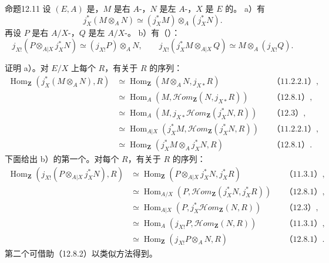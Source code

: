 \begin{SGAresult}{命题}{12.11}
设 $(E,A)$ 是，$M$ 是右 $A$-，$N$ 是左 $A$-，$X$ 是 $E$ 的。
a）有
\[j_X^*(M\otimes_A N)\simeq(j_X^*M)\otimes_A(j_X^*N).\]
再设 $P$ 是右 $A/X$-，$Q$ 是左 $A/X$-。
b）有（）：
\[j_{X!}(P\otimes_{A|X}j_X^*N)\simeq(j_{X!}P)\otimes_A N,\qquad
j_{X!}(j_X^*M\otimes_{A|X}Q)\simeq M\otimes_A(j_{X!}Q).\]
\end{SGAresult}
证明 a）。对 $E/X$ 上每个 $R$，有关于 $R$ 的序列：
\begin{align*}
\operatorname{Hom}_{\mathbf Z}(j_X^*(M\otimes_A N),R)
&\simeq\operatorname{Hom}_{\mathbf Z}(M\otimes_A N,j_{X*}R)&&\text{（11.2.2.1）},\\
&\simeq\operatorname{Hom}_A(M,\mathscr{H}\!om_{\mathbf Z}(N,j_{X*}R))&&\text{（12.8.1）},\\
&\simeq\operatorname{Hom}_A(M,j_{X*}\mathscr{H}\!om_{\mathbf Z}(j_X^*N,R))&&\text{（12.3）},\\
&\simeq\operatorname{Hom}_{A|X}(j_X^*M,\mathscr{H}\!om_{\mathbf Z}(j_X^*N,R))&&\text{（11.2.2.1）},\\
&\simeq\operatorname{Hom}_{\mathbf Z}(j_X^*M\otimes_A j_X^*N,R)&&\text{（12.8.1）}.
\end{align*}
下面给出 b）的第一个。对每个 $R$，有关于 $R$ 的序列：
\begin{align*}
\operatorname{Hom}_{\mathbf Z}(j_{X!}(P\otimes_{A|X}j_X^*N),R)
&\simeq\operatorname{Hom}_{\mathbf Z}(P\otimes_{A|X}j_X^*N,j_X^*R)&&\text{（11.3.1）},\\
&\simeq\operatorname{Hom}_{A/X}(P,\mathscr{H}\!om_{\mathbf Z}(j_X^*N,j_X^*R))&&\text{（12.8.1）},\\
&\simeq\operatorname{Hom}_{A|X}(P,j_X^*\mathscr{H}\!om_{\mathbf Z}(N,R))&&\text{（12.3）},\\
&\simeq\operatorname{Hom}_A(j_{X!}P,\mathscr{H}\!om_{\mathbf Z}(N,R))&&\text{（11.3.1）},\\
&\simeq\operatorname{Hom}_{\mathbf Z}(j_{X!}P\otimes_A N,R)&&\text{（12.8.1）}.
\end{align*}
第二个可借助（12.8.2）以类似方法得到。
